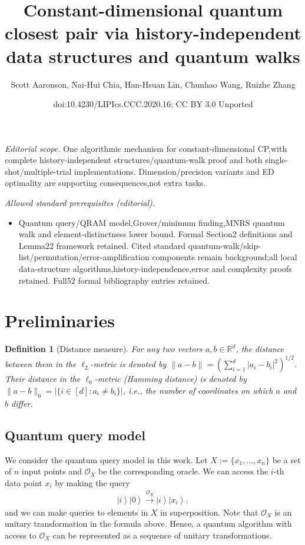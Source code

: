 \documentclass[10pt,a4paper]{article}
\title{Constant-dimensional quantum closest pair via history-independent data structures and quantum walks}
\author{Scott Aaronson, Nai-Hui Chia, Han-Hsuan Lin, Chunhao Wang, Ruizhe Zhang}
\date{doi:10.4230/LIPIcs.CCC.2020.16; CC BY 3.0 Unported}
\newtheorem{definition}[theorem]{Definition}
\newcommand{\R}{\mathbb{R}}
\newcommand{\ket}[1]{\left| #1 \right\rangle}
\newcommand{\ora}{\mathcal{O}}
\begin{document}
\maketitle
\noindent\textit{Editorial scope.} One algorithmic mechanism for constant-dimensional CP,with complete history-independent structures/quantum-walk proof and both single-shot/multiple-trial implementations. Dimension/precision variants and ED optimality are supporting consequences,not extra tasks.\par\medskip
\noindent\textit{Allowed standard prerequisites (editorial).}\begin{itemize}
\item Quantum query/QRAM model,Grover/minimum finding,MNRS quantum walk and element-distinctness lower bound. Formal Section2 definitions and Lemma22 framework retained. Cited standard quantum-walk/skip-list/permutation/error-amplification components remain background;all local data-structure algorithms,history-independence,error and complexity proofs retained. Full52 formal bibliography entries retained.
\end{itemize}\medskip
\setcounter{section}{1}
\setcounter{theorem}{5}
\section{Preliminaries}
\begin{definition}[Distance measure]
For any two vectors $a,b\in\R^d$, the distance between them in the $\ell_2$-metric is denoted by $\|a-b\|=\left(\sum_{i=1}^d|a_i-b_i|^2\right)^{1/2}$.
Their distance in the $\ell_0$-metric (Hamming distance) is denoted by 
$\|a-b\|_0=|\{i\in[d]:a_i\neq b_i\}|$, i.e.,
the number of coordinates on which $a$ and $b$ differ.
\end{definition}


\subsection{Quantum query model}

We consider the quantum query model in this work. Let $X:=\{x_1,\dots,x_n\}$ be a set of $n$ input points and $\ora_X$ be the corresponding oracle. We can access the $i$-th data point $x_i$ by making the query 
\begin{align}
    \ket{i}\ket{0} \xrightarrow{\ora_X} \ket{i}\ket{x_i},  
\end{align}
and we can make queries to elements in $X$ in superposition. Note that $\ora_X$ is an unitary transformation in the formula above. Hence, a quantum algorithm with access to $\ora_X$ can be represented as a sequence of unitary transformations. 
\end{document}
